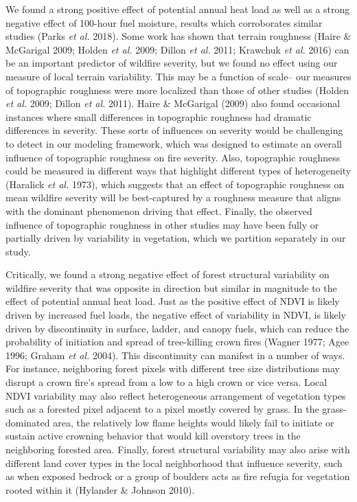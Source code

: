 \documentclass[]{article}
\begin{document}
We found a strong positive effect of potential annual heat load as well
as a strong negative effect of 100-hour fuel moisture, results which
corroborates similar studies (Parks \emph{et al.} 2018). Some work has
shown that terrain roughness (Haire \& McGarigal 2009; Holden \emph{et
al.} 2009; Dillon \emph{et al.} 2011; Krawchuk \emph{et al.} 2016) can
be an important predictor of wildfire severity, but we found no effect
using our measure of local terrain variability. This may be a function
of scale-- our measures of topographic roughness were more localized
than those of other studies (Holden \emph{et al.} 2009; Dillon \emph{et
al.} 2011). Haire \& McGarigal (2009) also found occasional instances
where small differences in topographic roughness had dramatic
differences in severity. These sorts of influences on severity would be
challenging to detect in our modeling framework, which was designed to
estimate an overall influence of topographic roughness on fire severity.
Also, topographic roughness could be measured in different ways that
highlight different types of heterogeneity (Haralick \emph{et al.}
1973), which suggests that an effect of topographic roughness on mean
wildfire severity will be best-captured by a roughness measure that
aligns with the dominant phenomenon driving that effect. Finally, the
observed influence of topographic roughness in other studies may have
been fully or partially driven by variability in vegetation, which we
partition separately in our study.

Critically, we found a strong negative effect of forest structural
variability on wildfire severity that was opposite in direction but
similar in magnitude to the effect of potential annual heat load. Just
as the positive effect of NDVI is likely driven by increased fuel loads,
the negative effect of variability in NDVI, is likely driven by
discontinuity in surface, ladder, and canopy fuels, which can reduce the
probability of initiation and spread of tree-killing crown fires (Wagner
1977; Agee 1996; Graham \emph{et al.} 2004). This discontinuity can
manifest in a number of ways. For instance, neighboring forest pixels
with different tree size distributions may disrupt a crown fire's spread
from a low to a high crown or vice versa. Local NDVI variability may
also reflect heterogeneous arrangement of vegetation types such as a
forested pixel adjacent to a pixel mostly covered by grass. In the
grass-dominated area, the relatively low flame heights would likely fail
to initiate or sustain active crowning behavior that would kill
overstory trees in the neighboring forested area. Finally, forest
structural variability may also arise with different land cover types in
the local neighborhood that influence severity, such as when exposed
bedrock or a group of boulders acts as fire refugia for vegetation
rooted within it (Hylander \& Johnson 2010).
\end{document}
